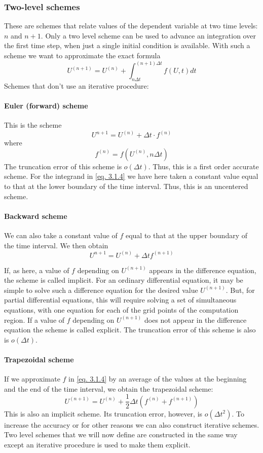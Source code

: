 \subsubsection{Two-level schemes}
These are schemes that relate values of the dependent variable at two time levels: $n$ and $n + 1$. Only a two level scheme can be used to advance an integration over the first time step, when just a single initial condition is available. With such a scheme we want to approximate the exact formula
\begin{equation}\label{eq. 3.1.4}
	U^{(n+1)}=U^{(n)}+\int_{n\Delta t}^{(n+1)\Delta t}f(U,t)dt
\end{equation}
Schemes that don't use an iterative procedure:
\paragraph{Euler (forward) scheme}
This is the scheme
\begin{equation}\label{3.1.5}
	U^{n+1}=U^{(n)}+\Delta t\cdot f^{(n)}
\end{equation}
where
$$f^{(n)}=f\left(U^{(n)},n\Delta t\right)$$
The truncation error of this scheme is $o(\Delta t)$. Thus, this is a first order accurate scheme. For the integrand in \ref{eq. 3.1.4} we have here taken a constant value equal to that at the lower boundary of the time interval. Thus, this is an uncentered scheme.
\paragraph{Backward scheme}
We can also take a constant value of $f$ equal to that at the upper boundary of the time interval. We then obtain
\begin{equation}\label{3.1.6}
	U^{n+1}=U^{(n)}+\Delta t f^{(n+1)}
\end{equation}

If, as here, a value of $f$ depending on $U^{(n+1)}$ appears in the difference equation, the scheme is called implicit. For an ordinary differential equation, it may be simple to solve such a difference equation for the desired value $U^{(n+1)}$. But, for partial differential equations, this will require solving a set of simultaneous equations, with one equation for each of the grid points of the computation region. If a value of $f$ depending on $U^{(n+1)}$ does not appear in the difference equation the scheme is called explicit. The truncation error of this scheme is also is $o(\Delta t)$.
\paragraph{Trapezoidal scheme}
If we approximate $f$ in \ref{eq. 3.1.4} by an average of the values at the beginning and the end of the time interval, we obtain the trapezoidal scheme:
\begin{equation}\label{3.1.7}
	U^{(n+1)}=U^{(n)}+\frac{1}{2}\Delta t\left(f^{(n)}+f^{(n+1)}\right)
\end{equation}
This is also an implicit scheme. Its truncation error, however, is $o(\Delta t^2)$. To increase the accuracy or for other reasons we can also construct iterative schemes. Two level schemes that we will now define are constructed in the same way except an iterative procedure is used to make them explicit.

